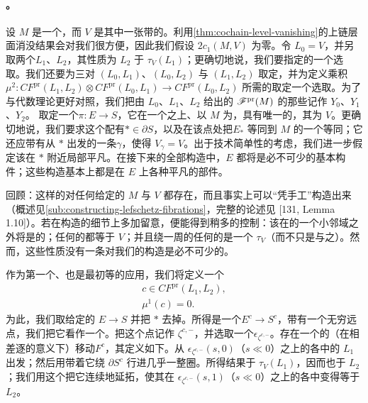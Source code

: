 \paragraph{\trBasicMorphism。}\label{sub:basic-morphism}
设 $M$ 是一个\trExactSymplectic\trCorneredBoundary\trManifold，而 $V$ 是其中一张带\trFrame{}的\trExact\trLagrange\trSphere。利用\cref{thm:cochain-level-vanishing}的上链层面消没结果会对我们很方便，因此我们假设 $2c_1(M,V)$ 为零。令 $L_0=V$，并另取两个\trExact\trLagrange\trSubmanifold{}$L_1$、$L_2$，其性质为 $L_2$ \trIsotopy{}于 $\tau_V(L_1)$；更确切地说，我们要指定\trIsotopy{}的一个选取。我们还要为三对 $(L_0,L_1)$、$(L_0,L_2)$ 与 $(L_1,L_2)$ 取定\trFloerDatum，并为定义乘积 $\mu^2\colon CF^{\mathrm{pr}}(L_1,L_2)\otimes CF^{\mathrm{pr}}(L_0,L_1)\to CF^{\mathrm{pr}}(L_0,L_2)$ 所需的\trPerturbationDatum{}取定一个选取。为了与代数理论更好对照，我们把由 $L_0$、$L_1$、$L_2$ 给出的 $\mathscr{F}^{\mathrm{pr}}(M)$ 的那些\trObject{}记作 $Y_0$、$Y_1$、$Y_2$。
取定一个\trLefschetzFibration{}$\pi\colon E\to S$，它在一个\trDisk{}之上、以 $M$ 为\trFiber，具有唯一的\trCriticalPoint，其\trVanishingCycle{}为 $V$。更确切地说，我们要求这个\trFibration{}配有\trMarkedPoint{}$\ast\in\partial S$，以及在该点处把\trFiber{}$E_\ast$ 等同到 $M$ 的一个等同；它还应带有从 $\ast$ 出发的一条\trVanishingPath{}$\gamma$，使得 $V_\gamma=V$。出于技术简单性的考虑，我们进一步假定该\trFibration{}在 $\ast$ 附近局部平凡。在接下来的全部构造中，$E$ 都将是必不可少的基本构件；这些构造基本上都是在 $E$ 上\trGluing{}各种平凡的部件。
\begin{remark}\label{thm:fibrations-exist-by-hand}
回顾：这样的\trFibration{}对任何给定的 $M$ 与 $V$ 都存在，而且事实上可以“凭手工”构造出来（概述见\cref{sub:constructing-lefschetz-fibrations}，完整的论述见 [131, Lemma 1.10]）。若在构造的细节上多加留意，便能得到稍多的控制：该\trSymplectic\trConnection{}在\trCriticalPoint{}的一个小邻域之外将是\trFlat{}的；任何\trVanishingPath{}的\trVanishingCycle{}都等于 $V$；并且绕\trCriticalValue{}一周的任何\trLoop{}的\trMonodromy{}是一个 \trDehnTwist{}$\tau_V$（而不只是与之\trIsotopy）。然而，这些性质没有一条对我们的构造是必不可少的。
\end{remark}
作为第一个、也是最初等的应用，我们将定义一个\trFloer{}\trCocycle
\begin{equation}\label{eq:floer-cocycle-c}
\boxed{\begin{gathered}
c\in CF^{\mathrm{pr}}(L_1,L_2),\\
\mu^1(c)=0.
\end{gathered}}
\end{equation}
为此，我们取给定的 $E\to S$ 并把 $\ast$ 去掉。所得是一个\trLefschetzFibration{}$E^c\to S^c$，带有一个无穷远点，我们把它看作一个\trIncomingPoint。把这个点记作 $\zeta^{c,-}$，并选取一个\trStriplikeEnd{}$\epsilon_{\zeta^{c,-}}$。存在一个\trCanonical{}的（在相差逐\trFiber\trIsotopy{}的意义下）移动\trLagrange\trBoundaryCondition{}$F^c$，其定义如下。从 $\epsilon_{\zeta^{c,-}}(s,0)$（$s\ll0$）之上的各\trFiber{}中的 $L_1$ 出发；然后用\trParallelTransport{}带着它绕 $\partial S^c$ 行进几乎一整圈。所得结果\trIsotopy{}于 $\tau_V(L_1)$，因而也\trIsotopy{}于 $L_2$；我们用这个\trIsotopy{}把它连续地延拓，使其在 $\epsilon_{\zeta^{c,-}}(s,1)$（$s\ll0$）之上的各\trFiber{}中变得等于 $L_2$。
